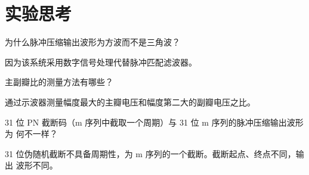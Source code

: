 \documentclass[../main]{subfiles}
\begin{document}
\section{实验思考}%
\label{sec:\arabic{chapter}thought}

\begin{Exercise}
  为什么脉冲压缩输出波形为方波而不是三角波？
\end{Exercise}

\begin{Answer}
  因为该系统采用数字信号处理代替脉冲匹配滤波器。
\end{Answer}

\begin{Exercise}
  主副瓣比的测量方法有哪些？
\end{Exercise}

\begin{Answer}
  通过示波器测量幅度最大的主瓣电压和幅度第二大的副瓣电压之比。
\end{Answer}

\begin{Exercise}
  31 位 PN 截断码（m 序列中截取一个周期）与 31 位 m 序列的脉冲压缩输出波形为
  何不一样？
\end{Exercise}

\begin{Answer}
  31 位伪随机截断不具备周期性，为 m 序列的一个截断。截断起点、终点不同，输出
     波形不同。
\end{Answer}
\end{document}
